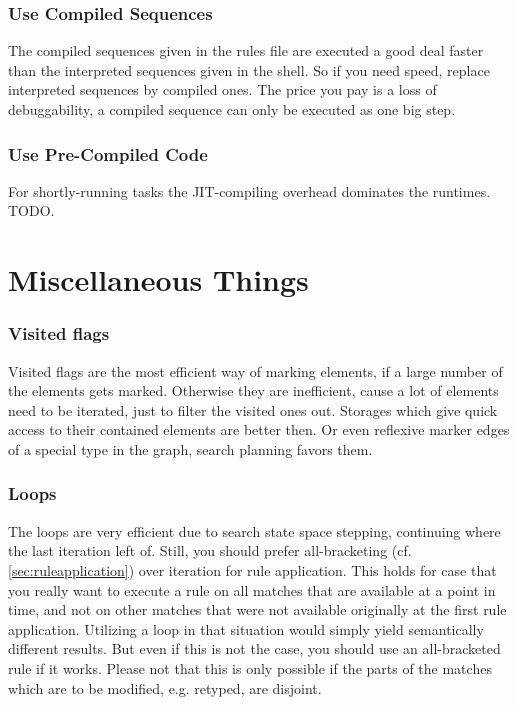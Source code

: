 \subsubsection*{Use Compiled Sequences}
The compiled sequences given in the rules file are executed a good deal faster than the interpreted sequences given in the shell.
So if you need speed, replace interpreted sequences by compiled ones.
The price you pay is a loss of debuggability, a compiled sequence can only be executed as one big step.

\subsubsection*{Use Pre-Compiled Code}
For shortly-running tasks the JIT-compiling overhead dominates the runtimes.
TODO.


\section{Miscellaneous Things}

\subsubsection*{Visited flags}
Visited flags are the most efficient way of marking elements, if a large number of the elements gets marked.
Otherwise they are inefficient, cause a lot of elements need to be iterated, just to filter the visited ones out.
Storages which give quick access to their contained elements are better then.
Or even reflexive marker edges of a special type in the graph, search planning favors them.

\subsubsection*{Loops}
The loops are very efficient due to search state space stepping, continuing where the last iteration left of.
Still, you should prefer all-bracketing (cf. \ref{sec:ruleapplication}) over iteration for rule application.
This holds for case that you really want to execute a rule on all matches that are available at a point in time, and not on other matches that were not available originally at the first rule application.
Utilizing a loop in that situation would simply yield semantically different results.
But even if this is not the case, you should use an all-bracketed rule if it works.
Please not that this is only possible if the parts of the matches which are to be modified, e.g. retyped, are disjoint.

